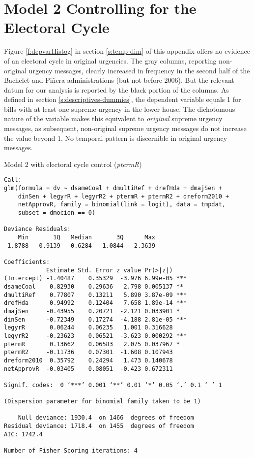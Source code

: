 \documentclass[letter,12pt]{article}
\begin{document}
\section{Model 2 Controlling for the Electoral Cycle}

Figure \ref{f:depvarHistog} in section \ref{s:temp-dim} of this appendix offers no evidence of an electoral cycle in original urgencies. The gray columns, reporting non-original urgency messages, clearly increased in frequency in the second half of the Bachelet and Pi\~nera administrations (but not before 2006). But the relevant datum for our analysis is reported by the black portion of the columns. As defined in section \ref{s:descriptives-dummies}, the dependent variable equals 1 for bills with at least one supreme urgency in the lower house. The dichotomous nature of the variable makes this equivalent to \emph{original} supreme urgency messages, as subsequent, non-original supreme urgency messages do not increase the value beyond 1. No temporal pattern is discernible in original urgency messages.

\begin{table}
  \begin{footnotesize}
\caption{Model 2 with electoral cycle control (\emph{ptermR})}\label{t:m2elect}
\centering
\begin{verbatim}
Call:
glm(formula = dv ~ dsameCoal + dmultiRef + drefHda + dmajSen + 
    dinSen + legyrR + legyrR2 + ptermR + ptermR2 + dreform2010 + 
    netApprovR, family = binomial(link = logit), data = tmpdat, 
    subset = dmocion == 0)

Deviance Residuals: 
    Min       1Q   Median       3Q      Max  
-1.8788  -0.9139  -0.6284   1.0844   2.3639  

Coefficients:
            Estimate Std. Error z value Pr(>|z|)    
(Intercept) -1.40487    0.35329  -3.976 6.99e-05 ***
dsameCoal    0.82930    0.29636   2.798 0.005137 ** 
dmultiRef    0.77807    0.13211   5.890 3.87e-09 ***
drefHda      0.94992    0.12404   7.658 1.89e-14 ***
dmajSen     -0.43955    0.20721  -2.121 0.033901 *  
dinSen      -0.72349    0.17274  -4.188 2.81e-05 ***
legyrR       0.06244    0.06235   1.001 0.316628    
legyrR2     -0.23623    0.06521  -3.623 0.000292 ***
ptermR       0.13662    0.06583   2.075 0.037967 *  
ptermR2     -0.11736    0.07301  -1.608 0.107943    
dreform2010  0.35792    0.24294   1.473 0.140678    
netApprovR  -0.03405    0.08051  -0.423 0.672311    
---
Signif. codes:  0 ‘***’ 0.001 ‘**’ 0.01 ‘*’ 0.05 ‘.’ 0.1 ‘ ’ 1

(Dispersion parameter for binomial family taken to be 1)

    Null deviance: 1930.4  on 1466  degrees of freedom
Residual deviance: 1718.4  on 1455  degrees of freedom
AIC: 1742.4

Number of Fisher Scoring iterations: 4
\end{verbatim}
\end{footnotesize}
\end{table}
\end{document}
